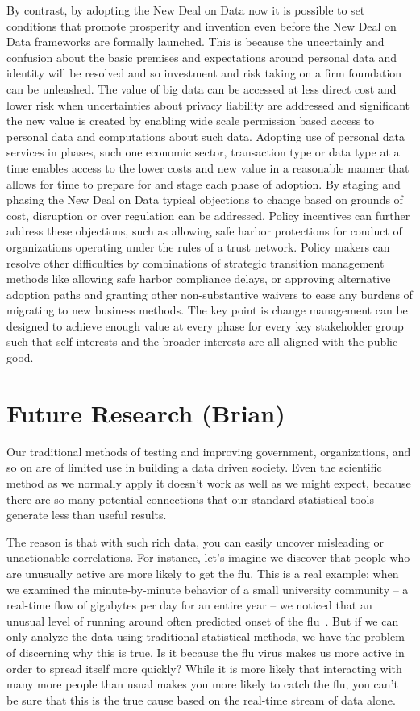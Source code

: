 By contrast, by adopting the New Deal on Data now it is possible to set conditions that promote prosperity and invention even before the New Deal on Data frameworks are formally launched. This is because the uncertainly and confusion about the basic premises and expectations around personal data and identity will be resolved and so investment and risk taking on a firm foundation can be unleashed. The value of big data can be accessed at less direct cost and lower risk when uncertainties about privacy liability are addressed and significant the new value is created by enabling wide scale permission based access to personal data and computations about such data. Adopting use of personal data services in phases, such one economic sector, transaction type or data type at a time enables access to the lower costs and new value in a reasonable manner that allows for time to prepare for and stage each phase of adoption.  By staging and phasing the New Deal on Data typical objections to change based on grounds of cost, disruption or over regulation can be addressed. Policy incentives can further address these objections, such as allowing safe harbor protections for conduct of organizations operating under the rules of a trust network.  Policy makers can resolve other difficulties by combinations of strategic transition management methods like allowing safe harbor compliance delays, or approving alternative adoption paths and granting other non-substantive waivers to ease any burdens of migrating to new business methods.  The key point is change management can be designed to achieve enough value at every phase for every key stakeholder group such that self interests and the broader interests are all aligned with the public good. 

\section{Future Research (Brian)}

Our traditional methods of testing and improving government, organizations, and so on are of limited use in building a data driven society. Even the scientific method as we normally apply it doesn't work as well as we might expect, because there are so many potential connections that our standard statistical tools generate less than useful results.

The reason is that with such rich data, you can easily uncover misleading or unactionable correlations. For instance, let’s imagine we discover that people who are unusually active are more likely to get the flu. This is a real example: when we examined the minute-by-minute behavior of a small university community – a real-time flow of gigabytes per day for an entire year – we noticed that an unusual level of running around often predicted onset of the flu~\cite{madan2010social}. But if we can only analyze the data using traditional statistical methods, we have the problem of discerning why this is true. Is it because the flu virus makes us more active in order to spread itself more quickly? While it is more likely that interacting with many more people than usual makes you more likely to catch the flu, you can't be sure that this is the true cause based on the real-time stream of data alone.

